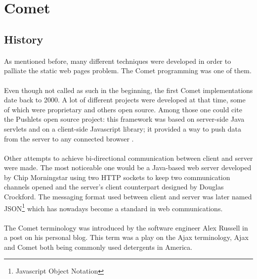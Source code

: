 \section{Comet}

\subsection{History}

\paragraph{} As mentioned before, many different techniques were developed in 
order to palliate the static web pages problem. The Comet programming was one 
of them.

\paragraph{} \cite{wiki-comet} Even though not called as such in the beginning, 
the first Comet implementations date back to 2000. A lot of different projects 
were developed at that time, some of which were proprietary and others open 
source. Among those one could cite the Pushlets open source project: this 
framework was based on server-side Java servlets and on a client-side Javascript 
library; it provided a way to push data from the server to any connected 
browser \cite{pushlets}.

\paragraph{} Other attempts to achieve bi-directional communication between 
client and server were made. The most noticeable one would be a Java-based 
web server  developed by Chip Morningstar\cite{wiki-chip-morningstar} using two 
HTTP sockets to keep two communication channels opened and the server's client 
counterpart designed by Douglas Crockford\cite{wiki-douglas-crockford}. The 
messaging format used between client and server was later named 
JSON\footnote{Javascript Object Notation} which has nowadays become a standard 
in web communications.

\paragraph{} The Comet terminology was introduced by the software engineer 
Alex Russell in a post on his personal blog\cite{alex-russell}. This term was a 
play on the Ajax terminology, Ajax and Comet both being commonly used detergents 
in America.

